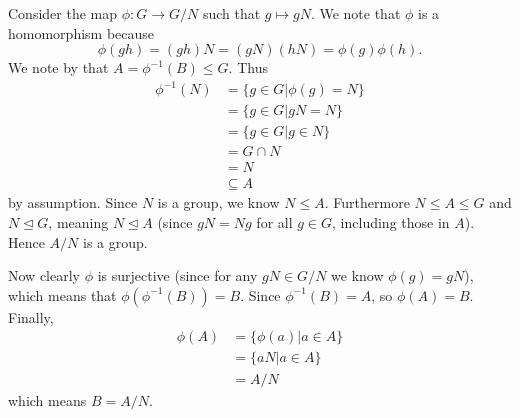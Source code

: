 \begin{questions}
    \item Consider the map $\phi: G \to G/N$ such that $g \mapsto gN$. We note that $\phi$ is a homomorphism because
    \[
        \phi(gh) = (gh)N = (gN)(hN) = \phi(g)\phi(h).
    \]
    We note by  that $A = \phi^{-1}(B) \leq G$. Thus
    \begin{align*}
        \phi^{-1}(N) &= \{g \in G \vert \phi(g) = N\}\\
        &= \{g \in G \vert gN = N\}\\
        &= \{g \in G \vert g \in N\}\\
        &= G \cap N\\
        &= N\\
        &\subseteq A
    \end{align*}
    by assumption. Since $N$ is a group, we know $N \leq A$. Furthermore $N \leq A \leq G$ and $N \unlhd G$, meaning $N \unlhd A$ (since $gN = Ng$ for all $g \in G$, including those in $A$). Hence $A/N$ is a group.

    Now clearly $\phi$ is surjective (since for any $gN \in G/N$ we know $\phi(g) = gN$), which means that $\phi(\phi^{-1}(B)) = B$. Since $\phi^{-1}(B) = A$, so $\phi(A) = B$. Finally,
    \begin{align*}
        \phi(A) &= \{\phi(a) \vert a \in A\}\\
        &= \{aN \vert a \in A\}\\
        &= A/N
    \end{align*}
    which means $B = A/N$.
\end{questions}
